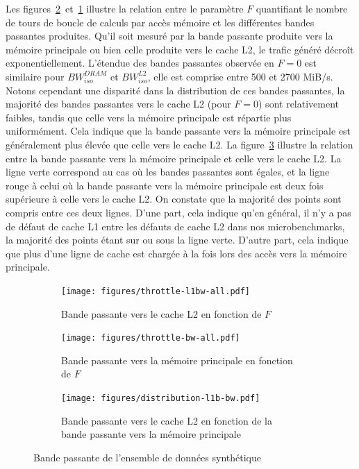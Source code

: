 Les figures~\ref{fig:throttle_bw_all}~et~\ref{fig:throttle_l2bw_all} illustre la relation entre le paramètre $F$ quantifiant le nombre de tours de boucle de calculs par accès mémoire et les différentes bandes passantes produites.
Qu'il soit mesuré par la bande passante produite vers la mémoire principale ou bien celle produite vers le cache L2, le trafic généré décroît exponentiellement.
L'étendue des bandes passantes observée en $F=0$ est similaire pour $BW^{DRAM}_{iso}$ et $BW^{L2}_{iso}$, elle est comprise entre 500 et 2700 MiB/s.
Notons cependant une disparité dans la distribution de ces bandes passantes, la majorité des bandes passantes vers le cache L2 (pour $F=0$) sont relativement faibles, tandis que celle vers la mémoire principale est répartie plus uniformément.
Cela indique que la bande passante vers la mémoire principale est généralement plus élevée que celle vers le cache L2.
La figure~\ref{fig:bw_bwl1} illustre la relation entre la bande passante vers la mémoire principale et celle vers le cache L2.
La ligne verte correspond au cas où les bandes passantes sont égales, et la ligne rouge à celui où la bande passante vers la mémoire principale est deux fois supérieure à celle vers le cache L2.
On constate que la majorité des points sont compris entre ces deux lignes.
D'une part, cela indique qu'en général, il n'y a pas de défaut de cache L1 entre les défauts de cache L2 dans nos microbenchmarks, la majorité des points étant sur ou sous la ligne verte. 
D'autre part, cela indique que plus d'une ligne de cache est chargée à la fois lors des accès vers la mémoire principale.

\begin{figure}[h!]
	\centering
	\begin{subfigure}{0.48\linewidth}
	\texttt{[image: figures/throttle-l1bw-all.pdf]}
	\caption{\label{fig:throttle_l2bw_all}Bande passante vers le cache L2 en fonction de $F$}
	\end{subfigure}
	\begin{subfigure}{0.48\linewidth}
	\texttt{[image: figures/throttle-bw-all.pdf]}
	\caption{\label{fig:throttle_bw_all}Bande passante vers la mémoire principale en fonction de $F$}
	\end{subfigure}
	\begin{subfigure}{0.5\linewidth}
		\texttt{[image: figures/distribution-l1b-bw.pdf]}
		\caption{\label{fig:bw_bwl1}Bande passante vers le cache L2 en fonction de la bande passante vers la mémoire principale}
	\end{subfigure}
	\caption{\label{fig:throttle_bw}Bande passante de l'ensemble de données synthétique}
\end{figure}

